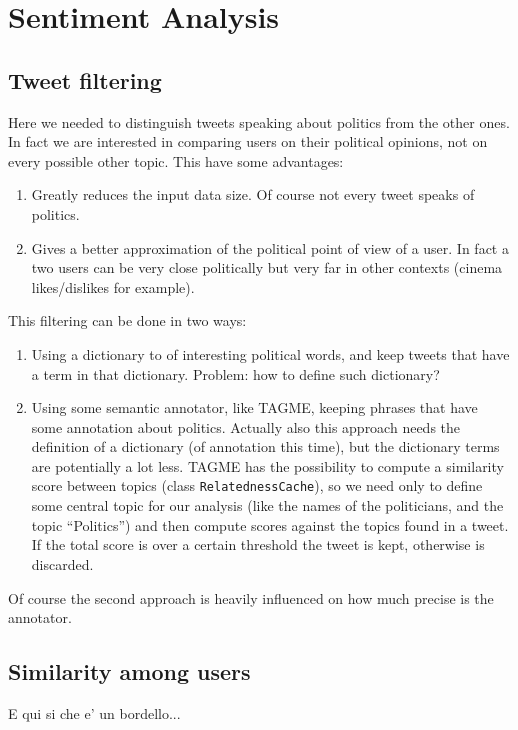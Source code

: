 \documentclass[a4paper,11pt,oneside]{article}
\begin{document}
\section{Sentiment Analysis}
\subsection{Tweet filtering}
Here we needed to distinguish tweets speaking about politics from the other ones. In fact we are interested in comparing users on their political opinions, not on every possible other topic. This have some advantages:
\begin{enumerate}
\item Greatly reduces the input data size. Of course not every tweet speaks of politics.
\item Gives a better approximation of the political point of view of a user. In fact a two users can be very close politically but very far in other contexts (cinema likes/dislikes for example).
\end{enumerate}

This filtering can be done in two ways:
\begin{enumerate}
\item Using a dictionary to of interesting political words, and keep tweets that have a term in that dictionary. Problem:  how to define such dictionary?
\item Using some semantic annotator, like TAGME, keeping phrases that have some annotation about politics. Actually also this approach needs the definition of a dictionary (of annotation this time), but the dictionary terms are potentially a lot less. TAGME has the possibility to compute a similarity score between topics (class \texttt{RelatednessCache}), so we need only to define some central topic for our analysis (like the names of the politicians, and the topic ``Politics'') and then compute scores against the topics found in a tweet. If the total score is over a certain threshold the tweet is kept, otherwise is discarded.
\end{enumerate}

Of course the second approach is heavily influenced on how much precise is the annotator.

\subsection{Similarity among users}
E qui si che e' un bordello...

%
\end{document}
